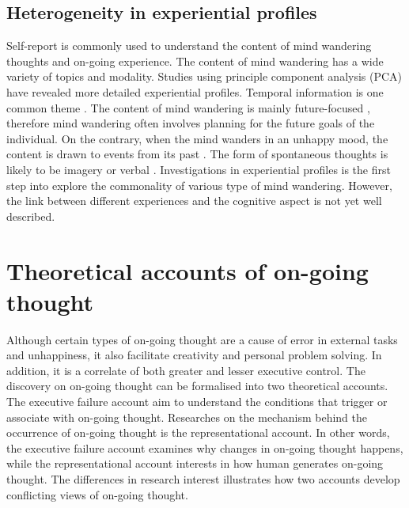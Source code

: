 \subsection{Heterogeneity in experiential profiles}
Self-report is commonly used to understand the content of mind wandering thoughts and on-going experience. The content of mind wandering has a wide variety of topics and modality. Studies using principle component analysis (PCA) have revealed more detailed experiential profiles. Temporal information is one common theme \cite{RubyFP2013,RubyPlos2013}. The content of mind wandering is mainly future-focused \cite{Baird2011}, therefore mind wandering often involves planning for the future goals of the individual. On the contrary, when the mind wanders in an unhappy mood, the content is drawn to events from its past \cite{Smallwood2011}. The form of spontaneous thoughts is likely to be imagery or verbal \cite{Gorgolewski2014,Smallwood2016}. Investigations in experiential profiles is the first step into explore the commonality of various type of mind wandering. However, the link between different experiences and the cognitive aspect is not yet well described.  



\section{Theoretical accounts of on-going thought}
\label{ch:intro:accounts}

Although certain types of on-going thought are a cause of error in external tasks and unhappiness, it also facilitate creativity and personal problem solving. In addition, it is a correlate of both greater and lesser executive control. The discovery on on-going thought can be formalised into two theoretical accounts. The executive failure account aim to understand the conditions that trigger or associate with on-going thought. Researches on the mechanism behind the occurrence of on-going thought is the representational account. In other words, the executive failure account examines why changes in on-going thought happens, while the representational account interests in how human generates on-going thought. The differences in research interest illustrates how two accounts develop conflicting views of on-going thought. 

